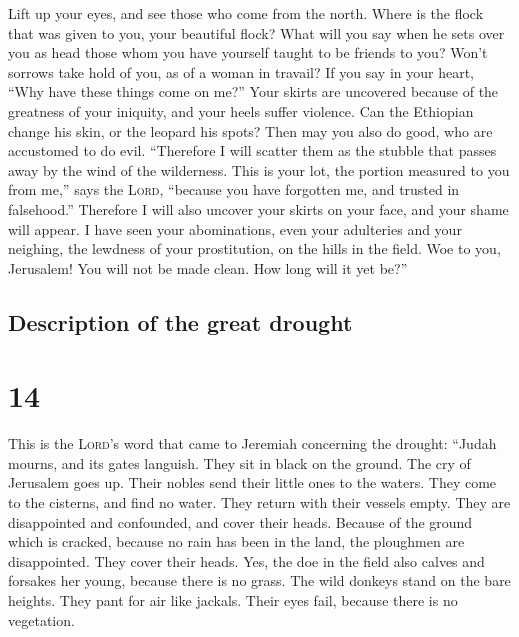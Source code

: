  Lift up your eyes, and see those who come from the
north. Where is the flock that was given to you, your beautiful flock?
 What will you say when he sets over you as head those
whom you have yourself taught to be friends to you? Won't sorrows take
hold of you, as of a woman in travail?  If you say in
your heart, ``Why have these things come on me?'' Your skirts are
uncovered because of the greatness of your iniquity, and your heels
suffer violence.  Can the Ethiopian change his skin, or
the leopard his spots? Then may you also do good, who are accustomed to
do evil.  ``Therefore I will scatter them as the stubble
that passes away by the wind of the wilderness.  This is
your lot, the portion measured to you from me,'' says the \textsc{Lord},
``because you have forgotten me, and trusted in falsehood.''
 Therefore I will also uncover your skirts on your face,
and your shame will appear.  I have seen your
abominations, even your adulteries and your neighing, the lewdness of
your prostitution, on the hills in the field. Woe to you, Jerusalem! You
will not be made clean. How long will it yet be?''

\hypertarget{description-of-the-great-drought}{%
\subsection{Description of the great
drought}\label{description-of-the-great-drought}}

\hypertarget{section-13}{%
\section{14}\label{section-13}}

 This is the \textsc{Lord}'s word that came to Jeremiah
concerning the drought:  ``Judah mourns, and its gates
languish. They sit in black on the ground. The cry of Jerusalem goes up.
 Their nobles send their little ones to the waters. They
come to the cisterns, and find no water. They return with their vessels
empty. They are disappointed and confounded, and cover their heads.
 Because of the ground which is cracked, because no rain
has been in the land, the ploughmen are disappointed. They cover their
heads.  Yes, the doe in the field also calves and forsakes
her young, because there is no grass.  The wild donkeys
stand on the bare heights. They pant for air like jackals. Their eyes
fail, because there is no vegetation.

